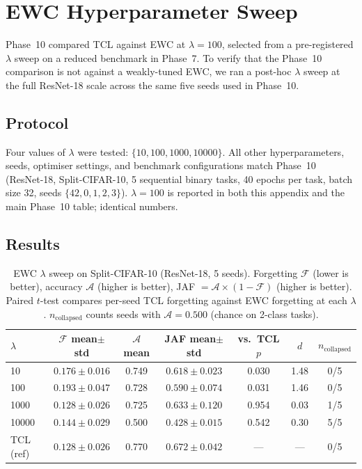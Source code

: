 
\section{EWC Hyperparameter Sweep}
\label{app:ewc_sweep}

Phase~10 compared TCL against EWC at $\lambda=100$, selected from a
pre-registered $\lambda$ sweep on a reduced benchmark in Phase~7.
To verify that the Phase~10 comparison is not against a weakly-tuned
EWC, we ran a post-hoc $\lambda$ sweep at the full ResNet-18 scale
across the same five seeds used in Phase~10.

\subsection{Protocol}

Four values of $\lambda$ were tested: $\{10, 100, 1000, 10000\}$.
All other hyperparameters, seeds, optimiser settings, and benchmark
configurations match Phase~10 (ResNet-18, Split-CIFAR-10, 5 sequential
binary tasks, 40 epochs per task, batch size 32, seeds
$\{42, 0, 1, 2, 3\}$).
$\lambda=100$ is reported in both this appendix and the main
Phase~10 table; identical numbers.

\subsection{Results}

\begin{table}[h]
\centering
\caption{EWC $\lambda$ sweep on Split-CIFAR-10 (ResNet-18, 5 seeds).
Forgetting $\mathcal{F}$ (lower is better), accuracy $\mathcal{A}$
(higher is better), JAF $= \mathcal{A}\times(1-\mathcal{F})$ (higher
is better). Paired $t$-test compares per-seed TCL forgetting against
EWC forgetting at each $\lambda$. $n_{\text{collapsed}}$ counts seeds
with $\mathcal{A} = 0.500$ (chance on 2-class tasks).}
\label{tab:ewc_sweep}
\begin{tabular}{lcccccc}
\toprule
$\lambda$ & $\mathcal{F}$ mean$\pm$std & $\mathcal{A}$ mean & JAF mean$\pm$std & vs.\ TCL $p$ & $d$ & $n_{\text{collapsed}}$ \\
\midrule
10      & $0.176\pm0.016$ & 0.749 & $0.618\pm0.023$ & 0.030 & 1.48 & 0/5 \\
100     & $0.193\pm0.047$ & 0.728 & $0.590\pm0.074$ & 0.031 & 1.46 & 0/5 \\
1000    & $0.128\pm0.026$ & 0.725 & $0.633\pm0.120$ & 0.954 & 0.03 & 1/5 \\
10000   & $0.144\pm0.029$ & 0.500 & $0.428\pm0.015$ & 0.542 & 0.30 & 5/5 \\
\midrule
TCL (ref) & $0.128\pm0.026$ & 0.770 & $0.672\pm0.042$ & --- & --- & 0/5 \\
\bottomrule
\end{tabular}
\end{table}

